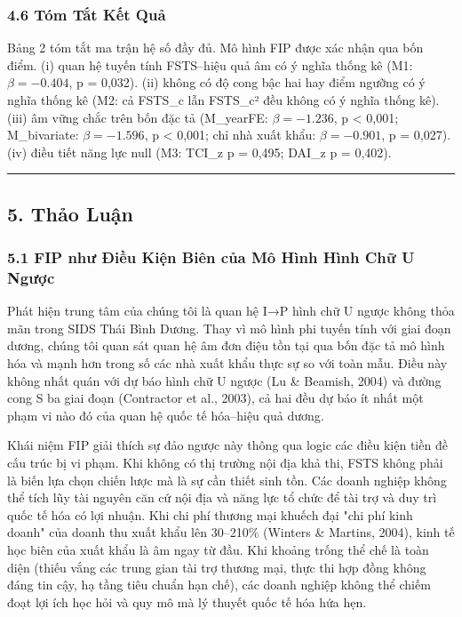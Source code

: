 \documentclass[12pt,a4paper]{article}
\begin{document}
\hypertarget{46-tuxf3m-tux1eaft-kux1ebft-quux1ea3}{%
\subsubsection{4.6 Tóm Tắt Kết
Quả}\label{46-tuxf3m-tux1eaft-kux1ebft-quux1ea3}}

Bảng 2 tóm tắt ma trận hệ số đầy đủ. Mô hình FIP được xác nhận qua bốn
điểm. (i) quan hệ tuyến tính FSTS--hiệu quả âm có ý nghĩa thống kê (M1:
\(\beta = −0.404\), p = 0,032). (ii) không có độ cong bậc hai hay điểm
ngưỡng có ý nghĩa thống kê (M2: cả FSTS\_c lẫn FSTS\_c² đều không có ý
nghĩa thống kê). (iii) âm vững chắc trên bốn đặc tả (M\_yearFE:
\(\beta = −1.236\), p \textless{} 0,001; M\_bivariate:
\(\beta = −1.596\), p \textless{} 0,001; chỉ nhà xuất khẩu:
\(\beta = −0.901\), p = 0,027). (iv) điều tiết năng lực null (M3: TCI\_z
p = 0,495; DAI\_z p = 0,402).

\begin{center}\rule{0.5\linewidth}{0.5pt}\end{center}

\hypertarget{5-thux1ea3o-luux1eadn}{%
\subsection{5. Thảo Luận}\label{5-thux1ea3o-luux1eadn}}

\hypertarget{51-fip-nhux1b0-ux111iux1ec1u-kiux1ec7n-biuxean-cux1ee7a-muxf4-huxecnh-huxecnh-chux1eef-u-ngux1b0ux1ee3c}{%
\subsubsection{5.1 FIP như Điều Kiện Biên của Mô Hình Hình Chữ U
Ngược}\label{51-fip-nhux1b0-ux111iux1ec1u-kiux1ec7n-biuxean-cux1ee7a-muxf4-huxecnh-huxecnh-chux1eef-u-ngux1b0ux1ee3c}}

Phát hiện trung tâm của chúng tôi là quan hệ I→P hình chữ U ngược không
thỏa mãn trong SIDS Thái Bình Dương. Thay vì mô hình phi tuyến tính với
giai đoạn dương, chúng tôi quan sát quan hệ âm đơn điệu tồn tại qua bốn
đặc tả mô hình hóa và mạnh hơn trong số các nhà xuất khẩu thực sự so với
toàn mẫu. Điều này không nhất quán với dự báo hình chữ U ngược (Lu \&
Beamish, 2004) và đường cong S ba giai đoạn (Contractor et al., 2003),
cả hai đều dự báo ít nhất một phạm vi nào đó của quan hệ quốc tế
hóa--hiệu quả dương.

Khái niệm FIP giải thích sự đảo ngược này thông qua logic các điều kiện
tiền đề cấu trúc bị vi phạm. Khi không có thị trường nội địa khả thi,
FSTS không phải là biến lựa chọn chiến lược mà là sự cần thiết sinh tồn.
Các doanh nghiệp không thể tích lũy tài nguyên căn cứ nội địa và năng
lực tổ chức để tài trợ và duy trì quốc tế hóa có lợi nhuận. Khi chi phí
thương mại khuếch đại "chi phí kinh doanh" của doanh thu xuất khẩu lên
30--210\% (Winters \& Martins, 2004), kinh tế học biên của xuất khẩu là
âm ngay từ đầu. Khi khoảng trống thể chế là toàn diện (thiếu vắng các
trung gian tài trợ thương mại, thực thi hợp đồng không đáng tin cậy, hạ
tầng tiêu chuẩn hạn chế), các doanh nghiệp không thể chiếm đoạt lợi ích
học hỏi và quy mô mà lý thuyết quốc tế hóa hứa hẹn.
\end{document}
